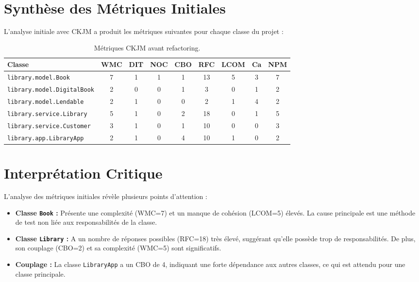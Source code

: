 \documentclass[11pt, a4paper]{article}
\begin{document}
\section{Synthèse des Métriques Initiales}
L'analyse initiale avec CKJM a produit les métriques suivantes pour chaque classe du projet :

\begin{table}[h!]
\centering
\begin{tabular}{|l|c|c|c|c|c|c|c|c|}
\hline
\textbf{Classe} & \textbf{WMC} & \textbf{DIT} & \textbf{NOC} & \textbf{CBO} & \textbf{RFC} & \textbf{LCOM} & \textbf{Ca} & \textbf{NPM} \\
\hline
\texttt{library.model.Book} & 7 & 1 & 1 & 1 & 13 & 5 & 3 & 7 \\
\hline
\texttt{library.model.DigitalBook} & 2 & 0 & 0 & 1 & 3 & 0 & 1 & 2 \\
\hline
\texttt{library.model.Lendable} & 2 & 1 & 0 & 0 & 2 & 1 & 4 & 2 \\
\hline
\texttt{library.service.Library} & 5 & 1 & 0 & 2 & 18 & 0 & 1 & 5 \\
\hline
\texttt{library.service.Customer} & 3 & 1 & 0 & 1 & 10 & 0 & 0 & 3 \\
\hline
\texttt{library.app.LibraryApp} & 2 & 1 & 0 & 4 & 10 & 1 & 0 & 2 \\
\hline
\end{tabular}
\caption{Métriques CKJM avant refactoring.}
\label{tab:metrics_before}
\end{table}

\section{Interprétation Critique}
L'analyse des métriques initiales révèle plusieurs points d'attention :
\begin{itemize}
    \item \textbf{Classe \texttt{Book} :} Présente une complexité (WMC=7) et un manque de cohésion (LCOM=5) élevés. La cause principale est une méthode de test non liée aux responsabilités de la classe.
    \item \textbf{Classe \texttt{Library} :} A un nombre de réponses possibles (RFC=18) très élevé, suggérant qu'elle possède trop de responsabilités. De plus, son couplage (CBO=2) et sa complexité (WMC=5) sont significatifs.
    \item \textbf{Couplage :} La classe \texttt{LibraryApp} a un CBO de 4, indiquant une forte dépendance aux autres classes, ce qui est attendu pour une classe principale.
\end{itemize}
\end{document}

